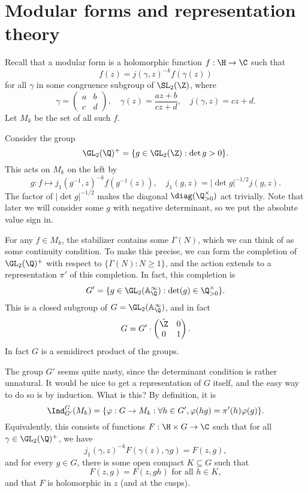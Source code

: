 \documentclass[a4paper]{article}
\newcommand\A{\mathbb{A}}
\begin{document}
\section{Modular forms and representation theory}
Recall that a modular form is a holomorphic function $f: \H \to \C$ such that
\[
  f(z) = j(\gamma, z)^{-k} f(\gamma (z))
\]
for all $\gamma$ in some congruence subgroup of $\SL_2(\Z)$, where
\[
  \gamma =
  \begin{pmatrix}
    a & b\\
    c & d
  \end{pmatrix},\quad \gamma(z) = \frac{az + b}{cz + d},\quad j(\gamma, z) = cz + d.
\]
Let $M_k$ be the set of all such $f$.

Consider the group
\[
  \GL_2(\Q)^+ = \{g \in \GL_2(\Z) : \det g > 0\}.
\]
This acts on $M_k$ on the left by
\[
  g: f \mapsto j_1(g^{-1}, z)^{-k} f(g^{-1}(z)),\quad j_1(g, z) = |\det g|^{-1/2} j(g, z).
\]
The factor of $|\det g|^{-1/2}$ makes the diagonal $\diag(\Q^\times_{> 0})$ act trivially. Note that later we will consider some $g$ with negative determinant, so we put the absolute value sign in.

For any $f \in M_k$, the stabilizer contains some $\Gamma(N)$, which we can think of as some continuity condition. To make this precise, we can form the completion of $\GL_2(\Q)^+$ with respect to $\{\Gamma(N) : N \geq 1\}$, and the action extends to a representation $\pi'$ of this completion. In fact, this completion is
\[
  G' = \{g \in \GL_2(\A^\infty_{\Q}) : \det (g) \in \Q^{\times}_{> 0}\}.
\]
This is a closed subgroup of $G = \GL_2(\A^\infty_\Q)$, and in fact
\[
  G = G' \cdot
  \begin{pmatrix}
    \hat{\Z} & 0\\
    0 & 1
  \end{pmatrix}.
\]
In fact $G$ is a semidirect product of the groups.

The group $G'$ seems quite nasty, since the determinant condition is rather unnatural. It would be nice to get a representation of $G$ itself, and the easy way to do so is by induction. What is this? By definition, it is
\[
  \Ind_{G'}^G(M_k) = \{\varphi: G \to M_k: \forall h \in G', \varphi(hg) = \pi'(h) \varphi(g)\}.
\]
Equivalently, this consists of functions $F: \H \times G \to \C$ such that for all $\gamma \in \GL_2(\Q)^+$, we have
\[
  j_1(\gamma, z)^{-k} F(\gamma(z), \gamma g) = F(z, g),
\]
and for every $g \in G$, there is some open compact $K \subseteq G$ such that
\[
  F(z, g) = F(z, gh) \text{ for all }h \in K,
\]
and that $F$ is holomorphic in $z$ (and at the cusps).
\end{document}
